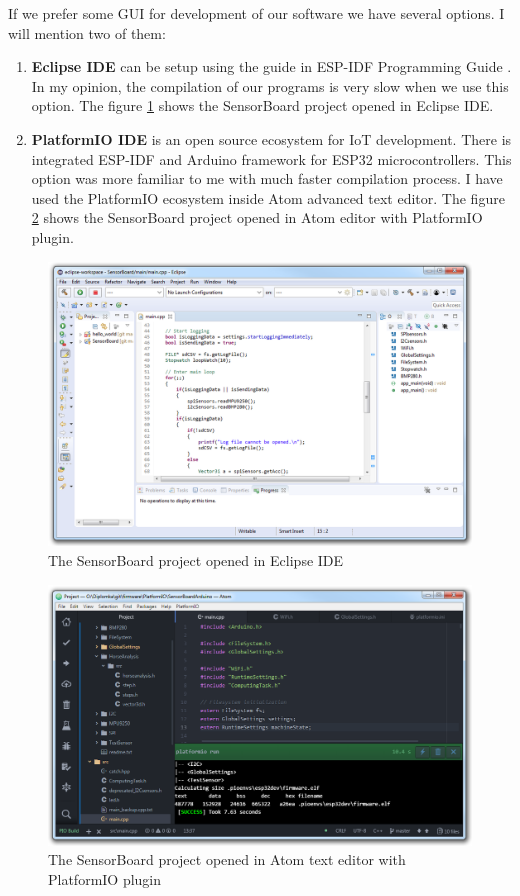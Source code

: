 If we prefer some GUI for development of our software we have several options. I will mention two of them:
\begin{enumerate}
	\item \textbf{Eclipse IDE} can be setup using the guide in \ac{ESP-IDF} Programming Guide \cite{ESP32eclipse}. In my opinion, the compilation of our programs is very slow when we use this option. The figure \ref{ESP32eclipse} shows the SensorBoard project opened in Eclipse IDE.
	\item \textbf{PlatformIO IDE} is an open source ecosystem for \ac{IoT} development. \cite{PlatformIO} There is integrated \ac{ESP-IDF} and Arduino framework for ESP32 microcontrollers. This option was more familiar to me with much faster compilation process. I have used the PlatformIO ecosystem inside Atom \cite{AtomEditor} advanced text editor. The figure \ref{ESP32atom} shows the SensorBoard project opened in Atom editor with PlatformIO plugin.
\end{enumerate}

\begin{figure}
	\centering
	\label{ESP32eclipse}
	\caption{The SensorBoard project opened in Eclipse IDE}
	\includegraphics[width=\linewidth]{img/ESP32eclipse.png}
\end{figure}

\begin{figure}
	\centering
	\label{ESP32atom}
	\caption{The SensorBoard project opened in Atom text editor with PlatformIO plugin}
	\includegraphics[width=\linewidth]{img/ESP32atom.png}
\end{figure}

